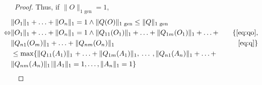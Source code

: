 \begin{proof}
  
  Thus, if  $\lVert O \rVert_{1 \text{ gen}} = 1$,
  \begin{align*}
    \hspace{-30pt}&  \lVert O_1  \rVert_1  + \ldots + \lVert O_n  \rVert_1 = 1  \wedge \lVert Q(O) \rVert_{1 \text{ gen}} \leq  \lVert Q \rVert_{1 \text{ gen}} \\
    \hspace{-30pt} \Leftrightarrow  & \lVert O_1  \rVert_1  + \ldots + \lVert O_n  \rVert_1 = 1  \wedge  \lVert Q_{11} (O_{1}) \rVert_{1} + \ldots +  \lVert Q_{1m} (O_{1}) \rVert_{1} + \ldots +  \hspace{10pt}&   \{\text{\autoref{eq:qo}}, \\
    \hspace{-30pt} & \lVert Q_{n1} (O_{m}) \rVert_{1} +  \ldots  + \lVert Q_{nm} (O_{n}) \rVert_{1}   & \text{\autoref{eq:q}} \} \\
    \hspace{-30pt}& \leq \max \{ \lVert Q_{11} (A_{1}) \rVert_{1} \hspace{1pt} + \ldots +  \lVert Q_{1m} (A_{1}) \rVert_{1}, \hspace{2pt} \ldots \hspace{2pt},  \lVert Q_{n1} (A_{n}) \rVert_{1} + \ldots +   \\
    \hspace{-30pt}&\lVert Q_{nm} (A_{n}) \rVert_{1} \hspace{1pt}  \vert  \lVert A_{1} \rVert_{1} = 1, \ldots, \lVert A_{n} \rVert_{1} = 1 \} \\

\end{align*}
\end{proof}
